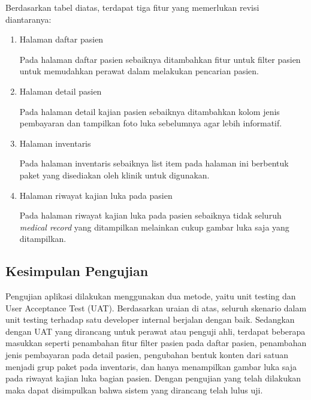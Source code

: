 Berdasarkan tabel diatas, terdapat tiga fitur yang memerlukan revisi diantaranya:
\begin{enumerate}
\item Halaman daftar pasien

Pada halaman daftar pasien sebaiknya ditambahkan fitur untuk filter pasien untuk memudahkan perawat dalam melakukan pencarian pasien. 
\item Halaman detail pasien

Pada halaman detail kajian pasien sebaiknya ditambahkan kolom jenis pembayaran dan tampilkan foto luka sebelumnya agar lebih informatif.
\item Halaman inventaris

Pada halaman inventaris sebaiknya list item pada halaman ini berbentuk paket yang disediakan oleh klinik untuk digunakan. 
\item Halaman riwayat kajian luka pada pasien

Pada halaman riwayat kajian luka pada pasien sebaiknya tidak seluruh \textit{medical record} yang ditampilkan melainkan cukup gambar luka saja yang ditampilkan.
\end{enumerate}

\subsection{Kesimpulan Pengujian}
Pengujian aplikasi dilakukan menggunakan dua metode, yaitu unit testing dan User Acceptance Test (UAT). Berdasarkan uraian di atas, seluruh skenario dalam unit testing terhadap satu developer internal berjalan dengan baik. Sedangkan dengan UAT yang dirancang untuk perawat atau penguji ahli, terdapat beberapa masukkan seperti penambahan fitur filter pasien pada daftar pasien, penambahan jenis pembayaran pada detail pasien, pengubahan bentuk konten dari satuan menjadi grup paket pada inventaris, dan hanya menampilkan gambar luka saja pada riwayat kajian luka bagian pasien. Dengan pengujian yang telah dilakukan maka dapat disimpulkan bahwa sistem yang dirancang telah lulus uji.

